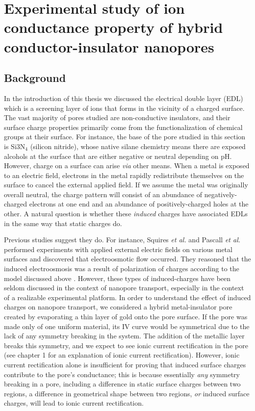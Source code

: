 \graphicspath{{../images/ch2/}}	%


\chapter{Experimental study of ion conductance property of hybrid conductor-insulator nanopores}
\label{chap:sin}
	

	\section{Background}
	
		In the introduction of this thesis we discussed the electrical double layer (EDL) which is a screening layer of ions that forms in the vicinity of a charged surface. The vast majority of pores studied are non-conductive insulators, and their surface charge properties primarily come from the functionalization of chemical groups at their surface. For instance, the base of the pore studied in this section is $\mathrm{Si{3}N_{4}}$ (silicon nitride), whose native silane chemistry means there are exposed alcohols at the surface that are either negative or neutral depending on pH. However, charge on a surface can arise \textit{via} other means. When a metal is exposed to an electric field, electrons in the metal rapidly redistribute themselves on the surface to cancel the external applied field. If we assume the metal was originally overall neutral, the charge pattern will consist of an abundance of negatively-charged electrons at one end and an abundance of positively-charged holes at the other. A natural question is whether these \textit{induced} charges have associated EDLs in the same way that static charges do.
		
		Previous studies suggest they do. For instance, Squires \textit{et al.} and Pascall \textit{et al.} performed experiments with applied external electric fields on various metal surfaces and discovered that electroosmotic flow occurred. They reasoned that the induced electroosmosis was a result of polarization of charges according to the model discussed above \cite{Squires2004, Pascall2010}. However, these types of induced-charges have been seldom discussed in the context of nanopore transport, especially in the context of a realizable experimental platform. In order to understand the effect of induced charges on nanopore transport, we considered a hybrid metal-insulator pore created by evaporating a thin layer of gold onto the pore surface. If the pore was made only of one uniform material, its IV curve would be symmetrical due to the lack of any symmetry breaking in the system. The addition of the metallic layer breaks this symmetry, and we expect to see ionic current rectification in the pore (see chapter 1 for an explanation of ionic current rectification). However, ionic current rectification alone is insufficient for proving that induced surface charges contribute to the pore's conductance; this is because essentially \textit{any} symmetry breaking in a pore, including a difference in static surface charges between two regions, a difference in geometrical shape between two regions, \textit{or} induced surface charges, will lead to ionic current rectification.
		
